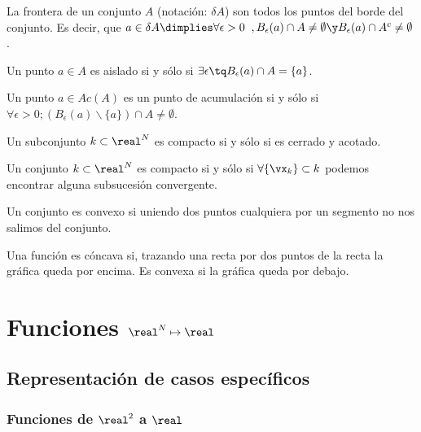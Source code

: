 \documentclass[12pt,a4paper,titlepage]{apuntes}
\begin{document}
\begin{defn}[Frontera] La frontera de un conjunto $A$ (notación: $\delta A$) son todos los puntos del borde del conjunto. Es decir, que $a\in \delta A \dimplies \forall \epsilon > 0\;\; , B_\epsilon(a) \cap A \neq \emptyset \y B_\epsilon(a) \cap A^c \neq \emptyset$.\end{defn}

\begin{defn} Un punto $a\in A$ es aislado si y sólo si $\exists \epsilon \tq B_\epsilon(a)\cap A =\{a\}$.\end{defn}

\begin{defn} Un punto $a\in Ac(A)$ es un punto de acumulación si y sólo si $\forall \epsilon > 0; (B_\epsilon(a) \backslash \{a\})\cap A \neq \emptyset$.\end{defn}

\begin{defn} Un subconjunto $k\subset \real^N$ es compacto si y sólo si es cerrado y acotado.\end{defn}

\begin{theorem} Un conjunto $k\subset \real^N$ es compacto si y sólo si $\forall \{\vx_k\} \subset k$ podemos encontrar alguna subsucesión convergente.\end{theorem}

\begin{defn} Un conjunto es convexo si uniendo dos puntos cualquiera por un segmento no nos salimos del conjunto.\end{defn}

\begin{defn} Una función es cóncava si, trazando una recta por dos puntos de la recta la gráfica queda por encima. Es convexa si la gráfica queda por debajo.\end{defn}
\section{Funciones $\real^N\mapsto\real$}

\subsection{Representación de casos específicos}
\subsubsection{Funciones de $\real^2$ a $\real$}
\end{document}
